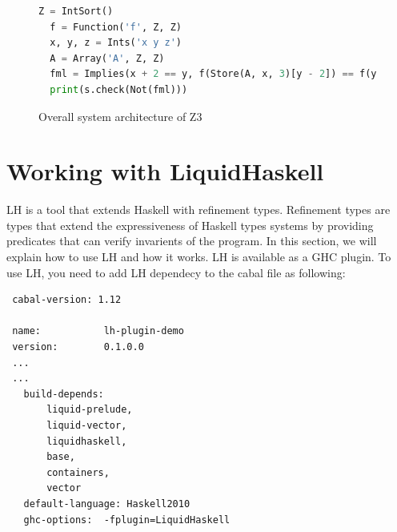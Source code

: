 \documentclass[]{rptuseminar}
\begin{document}
\begin{figure}[ht]
\begin{lstlisting}[language=Python]
  Z = IntSort()
  f = Function('f', Z, Z)
  x, y, z = Ints('x y z')
  A = Array('A', Z, Z)
  fml = Implies(x + 2 == y, f(Store(A, x, 3)[y - 2]) == f(y - x + 1))
  print(s.check(Not(fml)))
\end{lstlisting}
\end{figure}
\begin{figure}
			\begin{center}
			\end{center}
			\caption{%
         Overall system architecture of Z3
        \cite{nikolaj_bjorner_programming_nodate}
			}
			\label{fig:scholar} %
\end{figure}
\section{Working with LiquidHaskell}
\label{sec:lh}
LH is a tool that extends Haskell with refinement types. Refinement types are types that extend the expressiveness of Haskell types systems by providing predicates that can verify invarients of the program. In this section, we will explain how to use LH and how it works.
LH is available as a GHC plugin. To use LH, you need to add LH dependecy to the cabal file as following:

\vspace{1em}
\begin{lstlisting}
 cabal-version: 1.12

 name:           lh-plugin-demo
 version:        0.1.0.0
 ...
 ...
   build-depends:
       liquid-prelude,
       liquid-vector,
       liquidhaskell,
       base,
       containers,
       vector
   default-language: Haskell2010
   ghc-options:  -fplugin=LiquidHaskell
\end{lstlisting}
\vspace{1em}
\end{document}
